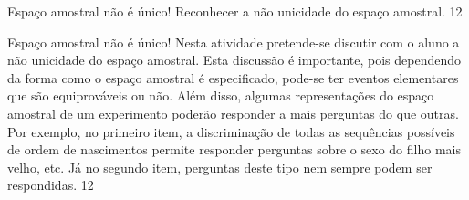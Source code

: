 \clearpage
\def\currentcolor{session2}
\begin{objectives}{Espaço amostral não é único!}
{
Reconhecer a não unicidade do espaço amostral.
}{1}{2}
\end{objectives}
\begin{sugestions}{Espaço amostral não é único!}
{
Nesta atividade pretende-se discutir com o aluno a não unicidade do espaço amostral. Esta discussão é importante, pois dependendo da forma como o espaço amostral é especificado, pode-se ter eventos elementares que são equiprováveis ou não. Além disso, algumas representações do espaço amostral de um experimento poderão responder a mais perguntas do que outras. Por exemplo, no primeiro item, a discriminação de todas as sequências possíveis de ordem de nascimentos permite responder perguntas sobre o sexo do filho mais velho, etc. Já no segundo item, perguntas deste tipo nem sempre podem ser respondidas.
}{1}{2}
\end{sugestions}
